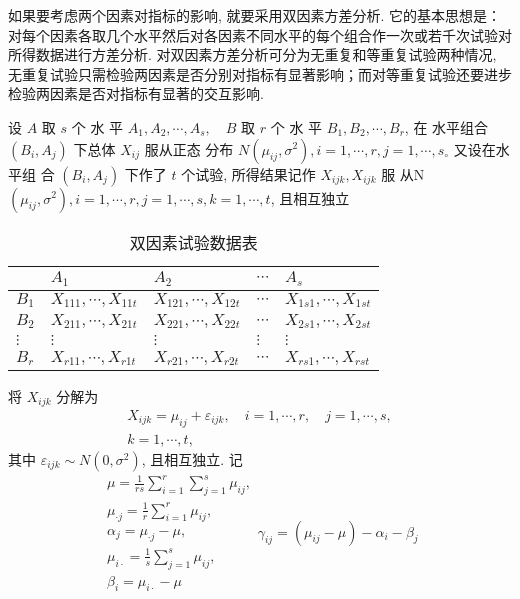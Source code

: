 如果要考虑两个因素对指标的影响, 就要采用双因素方差分析. 它的基本思想是：对每个因素各取几个水平然后对各因素不同水平的每个组合作一次或若千次试验对所得数据进行方差分析. 对双因素方差分析可分为无重复和等重复试验两种情况, 无重复试验只需检验两因素是否分别对指标有显著影响；而对等重复试验还要进步检验两因素是否对指标有显著的交互影响. 

设 \( {A} \) 取 \( {s} \) 个 水 平 \( {A}_{{1}}, {A}_{2}, \cdots, {A}_{s}, \quad {B} \) 取 \( {r} \) 个 水 平
\( {B}_{1}, {B}_{2}, \cdots, {B}_{r} \), 在 水平组合 \( \left({B}_{i}, {A}_{j}\right) \) 下总体 \( {X}_{i j} \) 服从正态
分布 \( N\left(\mu_{i j}, \sigma^{2}\right), i=1, \cdots, r, j=1, \cdots, s_{\circ} \) 又设在水平组
合 \( \left({B}_{i}, {A}_{j}\right) \) 下作了 \( {t} \) 个试验, 所得结果记作 \( {X}_{i j k}, {X}_{i j k} \) 服
从N \( \left(\mu_{i j}, \sigma^{2}\right), i=1, \cdots, r, j=1, \cdots, s, k=1, \cdots, t \), 且相互独立

\begin{table}
        \caption{双因素试验数据表}
        \begin{tabular}{l|llll}
        \hline & \( A_{1} \) & \( A_{2} \) & \( \cdots \) & \( A_{s} \) \\
        \hline \( {B}_{1} \) & \( X_{111}, \cdots, X_{11 t} \) & \( X_{121}, \cdots, X_{12 t} \) & \( \cdots \) & \( X_{1 s 1}, \cdots, X_{1 s t} \) \\
        \( B_{2} \) & \( X_{211}, \cdots, X_{21 t} \) & \( X_{221}, \cdots, X_{22 t} \) & \( \cdots \) & \( X_{2 s 1}, \cdots, X_{2 s t} \) \\
        \( \vdots \) & \( \vdots \) & \( \vdots \) & \( \vdots \) & \( \vdots \) \\
        \( B_{r} \) & \( X_{r 11}, \cdots, X_{r 1 t} \) & \( X_{r 21}, \cdots, X_{r 2 t} \) & \( \cdots \) & \( X_{r s 1}, \cdots, X_{r s t} \) \\
        \hline
        \end{tabular}
\end{table}

将 \( {X}_{i j k} \) 分解为
$$
\begin{array}{c}
X_{i j k}=\mu_{i j}+\varepsilon_{i j k}, \quad i=1, \cdots, r, \quad j=1, \cdots, s, \\
k=1, \cdots, t,
\end{array}
$$
其中 \( \varepsilon_{i j k} \sim N\left(0, \sigma^{2}\right) \), 且相互独立.  记
$$
\begin{array}{l}
\mu=\frac{1}{r s} \sum_{i=1}^{r} \sum_{j=1}^{s} \mu_{i j}, \\ \mu_{\cdot j}=\frac{1}{r} \sum_{i=1}^{r} \mu_{i j}, \\
 \alpha_{j}=\mu_{\cdot j}-\mu, \\
\mu_{i \cdot}=\frac{1}{s} \sum_{j=1}^{s} \mu_{i j} ,\\ 
 \beta_{i}=\mu_{i \cdot}-\mu
\end{array}
\gamma_{i j}=\left(\mu_{i j}-\mu\right)-\alpha_{i}-\beta_{j}
$$

